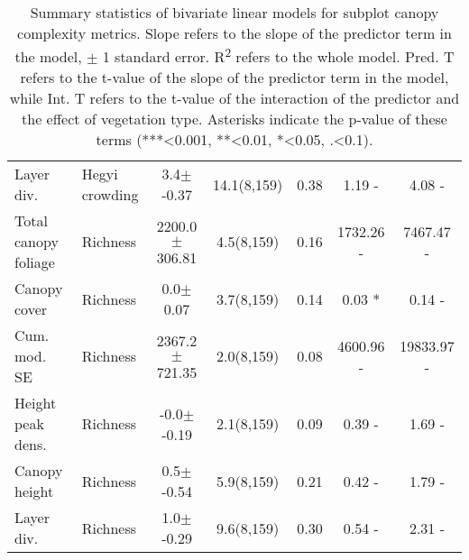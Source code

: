 \begin{table}[H]
\begin{tabular}{llS[table-format=4.1(4.2)]S[table-format=2.1]S[table-format=1.2]S[table-format=1.2]S[table-format=1.2]}
  Layer div. & Hegyi crowding & 3.4$\pm$-0.37 & 14.1(8,159) & 0.38 & 1.19 - & 4.08 - \\ 
  Total canopy foliage & Richness & 2200.0$\pm$306.81 & 4.5(8,159) & 0.16 & 1732.26 - & 7467.47 - \\ 
  Canopy cover & Richness & 0.0$\pm$0.07 & 3.7(8,159) & 0.14 & 0.03 * & 0.14 - \\ 
  Cum. mod. SE & Richness & 2367.2$\pm$721.35 & 2.0(8,159) & 0.08 & 4600.96 - & 19833.97 - \\ 
  Height peak dens. & Richness & -0.0$\pm$-0.19 & 2.1(8,159) & 0.09 & 0.39 - & 1.69 - \\ 
  Canopy height & Richness & 0.5$\pm$-0.54 & 5.9(8,159) & 0.21 & 0.42 - & 1.79 - \\ 
  Layer div. & Richness & 1.0$\pm$-0.29 & 9.6(8,159) & 0.30 & 0.54 - & 2.31 - \\ 
   \hline
\end{tabular}
\caption{Summary statistics of bivariate linear models for subplot canopy complexity metrics. Slope refers to the slope of the predictor term in the model, $\pm{}$ 1 standard error. R\textsuperscript{2} refers to the whole model. Pred. T refers to the t-value of the slope of the predictor term in the model, while Int. T refers to the t-value of the interaction of the predictor and the effect of vegetation type. Asterisks indicate the p-value of these terms (***<0.001, **<0.01, *<0.05, .<0.1).} 
\label{mod_bivar_lm_summ}
\end{table}

